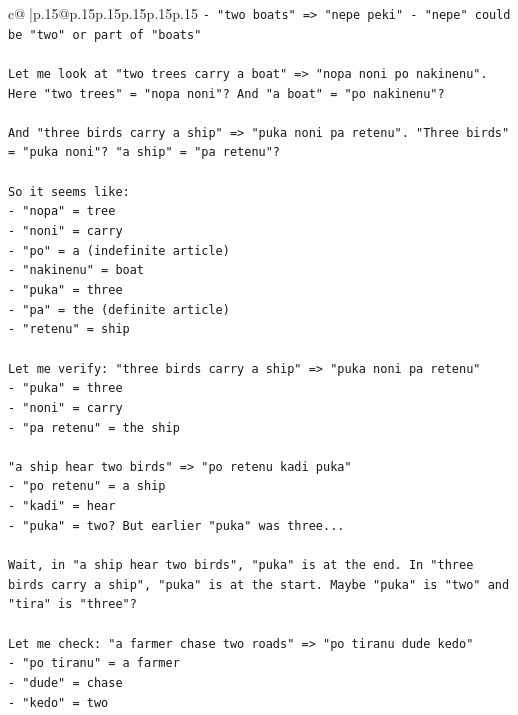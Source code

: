 \documentclass{article}
\begin{document}
{\begin{supertabular}{c@{$\;$}|p{.15\linewidth}@{}p{.15\linewidth}p{.15\linewidth}p{.15\linewidth}p{.15\linewidth}p{.15\linewidth}}
{{{\texttt{{-} "two boats" => "nepe peki" {-} "nepe" could be "two" or part of "boats"} \\
\\ 
\texttt{Let me look at "two trees carry a boat" => "nopa noni po nakinenu". Here "two trees" = "nopa noni"? And "a boat" = "po nakinenu"?} \\
\\ 
\texttt{And "three birds carry a ship" => "puka noni pa retenu". "Three birds" = "puka noni"? "a ship" = "pa retenu"?} \\
\\ 
\texttt{So it seems like:} \\
\texttt{{-} "nopa" = tree} \\
\texttt{{-} "noni" = carry} \\
\texttt{{-} "po" = a (indefinite article)} \\
\texttt{{-} "nakinenu" = boat} \\
\texttt{{-} "puka" = three} \\
\texttt{{-} "pa" = the (definite article)} \\
\texttt{{-} "retenu" = ship} \\
\\ 
\texttt{Let me verify: "three birds carry a ship" => "puka noni pa retenu"} \\
\texttt{{-} "puka" = three} \\
\texttt{{-} "noni" = carry} \\
\texttt{{-} "pa retenu" = the ship} \\
\\ 
\texttt{"a ship hear two birds" => "po retenu kadi puka"} \\
\texttt{{-} "po retenu" = a ship} \\
\texttt{{-} "kadi" = hear} \\
\texttt{{-} "puka" = two? But earlier "puka" was three...} \\
\\ 
\texttt{Wait, in "a ship hear two birds", "puka" is at the end. In "three birds carry a ship", "puka" is at the start. Maybe "puka" is "two" and "tira" is "three"?} \\
\\ 
\texttt{Let me check: "a farmer chase two roads" => "po tiranu dude kedo"} \\
\texttt{{-} "po tiranu" = a farmer} \\
\texttt{{-} "dude" = chase} \\
\texttt{{-} "kedo" = two} \\
}}}
\end{supertabular}}
\end{document}
